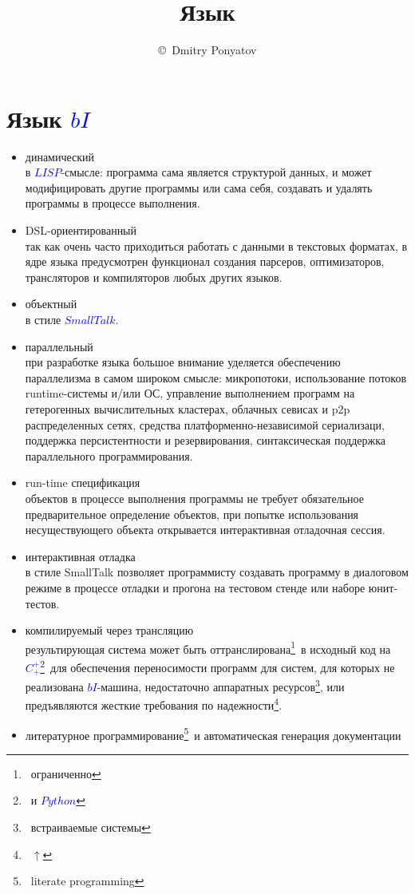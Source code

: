 \documentclass[oneside,12pt]{book}
\title{Язык \bi}
\author{\copyright\ Dmitry Ponyatov \email{dponyatov@gmail.com}}
\newcommand{\secly}[1]{
\section*{#1}
\addcontentsline{toc}{section}{#1}
}
\newcommand{\note}[1]{\footnote{\ #1}}
\newcommand{\cpp}{\textcolor{blue}{$C^+_+$}}
\newcommand{\py}{\textcolor{blue}{$Python$}}
\newcommand{\st}{\textcolor{blue}{$SmallTalk$}}
\newcommand{\lisp}{\textcolor{blue}{$LISP$}}
\newcommand{\bi}{\textcolor{blue}{$bI$}}
\begin{document}
\maketitle

\tableofcontents

\secly{Язык \bi}

\begin{itemize}

\item динамический
\\ в \lisp-смысле: программа сама является структурой данных, и может
модифицировать другие программы или сама себя, создавать и удалять программы в
процессе выполнения.

\item DSL-ориентированный
\\ так как очень часто приходиться работать с данными в
текстовых форматах, в ядре языка предусмотрен функционал создания парсеров, 
оптимизаторов, трансляторов и компиляторов любых других языков.

\item объектный
\\ в стиле \st.

\item параллельный
\\ при разработке языка большое внимание уделяется обеспечению параллелизма в 
самом широком смысле: микропотоки, использование потоков runtime-системы и/или
ОС, управление выполнением программ на гетерогенных вычислительных кластерах, 
облачных севисах и p2p распределенных сетях, средства платформенно-независимой
сериализаци, поддержка персистентности и резервирования, синтаксическая 
поддержка параллельного программирования.

\item run-time спецификация
\\ объектов в процессе выполнения программы не требует обязательное 
предварительное определение объектов, при попытке использования несуществующего 
объекта открывается интерактивная отладочная сессия.

\item интерактивная отладка
\\ в стиле SmallTalk позволяет программисту создавать программу в диалоговом
режиме в процессе отладки и прогона на тестовом стенде или наборе юнит-тестов.

\item компилируемый через трансляцию
\\ результирующая система может быть оттранслирована\note{ограниченно}\ в 
исходный код на \cpp\note{и \py}\ для обеспечения переносимости программ для систем,
для которых не реализована \bi-машина, недостаточно аппаратных 
ресурсов\note{встраиваемые системы}, или предъявляются жесткие требования по 
надежности\note{$\uparrow$}.

\item литературное программирование\note{literate programming}\ и 
автоматическая генерация документации  

\end{itemize}
\end{document}
